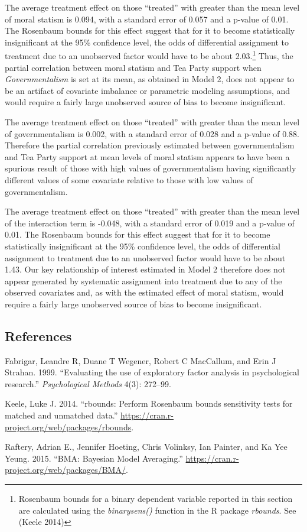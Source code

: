 \documentclass[12pt,]{article}
\begin{document}
The average treatment effect on those ``treated'' with greater than the
mean level of moral statism is 0.094, with a standard error of 0.057 and
a p-value of 0.01. The Rosenbaum bounds for this effect suggest that for
it to become statistically insignificant at the 95\% confidence level,
the odds of differential assignment to treatment due to an unobserved
factor would have to be about 2.03.\footnote{Rosenbaum bounds for a
  binary dependent variable reported in this section are calculated
  using the \emph{binarysens()} function in the R package
  \emph{rbounds}. See (Keele 2014)} Thus, the partial correlation
between moral statism and Tea Party support when \emph{Governmentalism}
is set at its mean, as obtained in Model 2, does not appear to be an
artifact of covariate imbalance or parametric modeling assumptions, and
would require a fairly large unobserved source of bias to become
insignificant.

The average treatment effect on those ``treated'' with greater than the
mean level of governmentalism is 0.002, with a standard error of 0.028
and a p-value of 0.88. Therefore the partial correlation previously
estimated between governmentalism and Tea Party support at mean levels
of moral statism appears to have been a spurious result of those with
high values of governmentalism having significantly different values of
some covariate relative to those with low values of governmentalism.

The average treatment effect on those ``treated'' with greater than the
mean level of the interaction term is -0.048, with a standard error of
0.019 and a p-value of 0.01. The Rosenbaum bounds for this effect
suggest that for it to become statistically insignificant at the 95\%
confidence level, the odds of differential assignment to treatment due
to an unobserved factor would have to be about 1.43. Our key
relationship of interest estimated in Model 2 therefore does not appear
generated by systematic assignment into treatment due to any of the
observed covariates and, as with the estimated effect of moral statism,
would require a fairly large unobserved source of bias to become
insignificant.


\clearpage

\subsection{References}

Fabrigar, Leandre R, Duane T Wegener, Robert C MacCallum, and Erin J
Strahan. 1999. ``Evaluating the use of exploratory factor analysis in
psychological research.'' \emph{Psychological Methods} 4(3): 272--99.

Keele, Luke J. 2014. ``rbounds: Perform Rosenbaum bounds sensitivity
tests for matched and unmatched data.''
\url{https://cran.r-project.org/web/packages/rbounds}.

Raftery, Adrian E., Jennifer Hoeting, Chris Volinksy, Ian Painter, and Ka Yee Yeung. 2015. ``BMA: Bayesian Model Averaging.''
\url{https://cran.r-project.org/web/packages/BMA/}.
\end{document}
